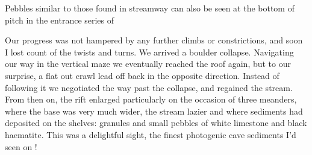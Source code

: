  \begin{marginfigure}
	\checkoddpage \ifoddpage \forcerectofloat \else \forceversofloat \fi
	\centering
	\caption{Pebbles similar to those found in \protect{} streamway can also be seen at the bottom of \protect{} pitch in the entrance series of \protect{} }
	\label{push your luck pebbles}
\end{marginfigure}

Our progress was not hampered by any further climbs or constrictions, and soon I lost count of the twists and turns. We arrived a boulder collapse. Navigating our way in the vertical maze we eventually reached the roof again, but to our surprise, a flat out crawl lead off back in the opposite direction. Instead of following it we negotiated the way past the collapse, and regained the stream. From then on, the rift enlarged particularly on the occasion of three meanders, where the base was very much wider, the stream lazier and where sediments had deposited on the shelves: granules and small pebbles of white limestone and black haematite. This was a delightful sight, the finest photogenic cave sediments I'd seen on !

